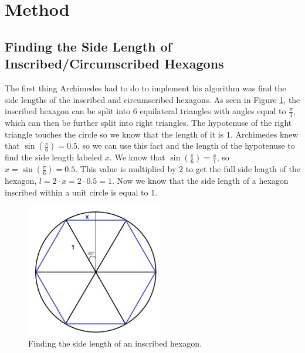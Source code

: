 \documentclass{article}
\begin{document}
\section{Method}
\subsection{Finding the Side Length of Inscribed/Circumscribed Hexagons}
The first thing Archimedes had to do to implement his algorithm was find the side lengths of the inscribed and circumscribed hexagons. As seen in Figure \ref{fig:1}, the inscribed hexagon can be split into 6 equilateral triangles with angles equal to $\frac{\pi}{3}$, which can then be further split into right triangles. The hypotenuse of the right triangle touches the circle so we know that the length of it is $1$. Archimedes knew that $\sin(\frac{\pi}{6})=0.5$, so we can use this fact and the length of the hypotenuse to find the side length labeled $x$. We know that $\sin({\frac{\pi}{6}})=\frac{x}{1}$, so $x=\sin({\frac{\pi}{6}})=0.5$. This value is multiplied by $2$ to get the full side length of the hexagon, $l = 2 \cdot x = 2 \cdot 0.5 = 1$. Now we know that the side length of a hexagon inscribed within a unit circle is equal to $1$.

\begin{figure}[htp]
    \centering
    \includegraphics[width=6cm]{figure1.jpeg}
    \caption{Finding the side length of an inscribed hexagon.}
    \label{fig:1}
\end{figure}
\end{document}
